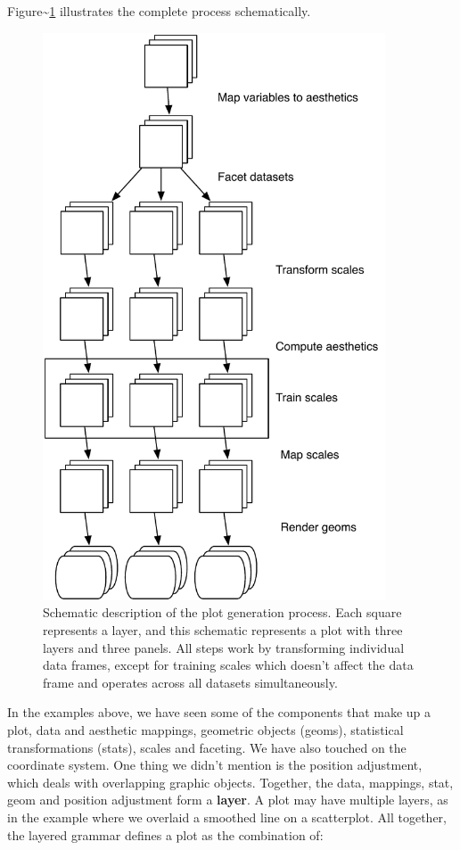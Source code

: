 Figure\textasciitilde{}\ref{fig:schematic} illustrates the complete
process schematically.

\begin{figure}[htbp]
  \centering
  \includegraphics[width=4in]{diagrams/mastery-schema}
  \caption{Schematic description of the plot generation process. Each square represents a layer, and this schematic represents a plot with three layers and three panels. All steps work by transforming individual data frames, except for training scales which doesn't affect the data frame and operates across all datasets simultaneously.}
  \label{fig:schematic}
\end{figure}


In the examples above, we have seen some of the components that make up
a plot, data and aesthetic mappings, geometric objects (geoms),
statistical transformations (stats), scales and faceting. We have also
touched on the coordinate system. One thing we didn't mention is the
position adjustment, which deals with overlapping graphic objects.
Together, the data, mappings, stat, geom and position adjustment form a
\textbf{layer}. A plot may have multiple layers, as in the example where
we overlaid a smoothed line on a scatterplot. All together, the layered
grammar defines a plot as the combination of: 

